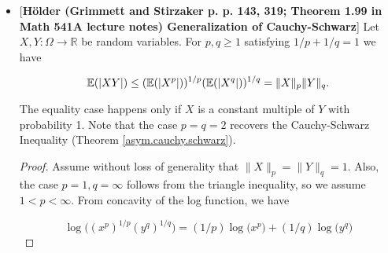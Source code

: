 \begin{itemize}
\begin{itemize}
\begin{proof}
But

\[
\E[a(X-\E X)+\phi(\E X)]  = a(\E X - \E X) + \E(\phi(\E X)) = \phi(\E X)
\]

which yields

\[
\phi( \E X) \leq \E \phi(X).
\]

\end{proof}

%
%
%
%
%
%
%
%
%
%
%

For some corollaries, see section \ref{cvx.sec.jensen.etc}.


\item \begin{theorem}\label{asym.thm.holder.ineq}[\textbf{H\"{o}lder (Grimmett and Stirzaker p. p. 143, 319; Theorem 1.99 in Math 541A lecture notes) Generalization of Cauchy-Schwarz}] Let \(X, Y : \Omega \to \mathbb{R}\) be random variables. For \(p, q \geq 1\) satisfying \(1/p + 1/q =1\) we have

\[
\mathbb{E}(|XY|) \leq (\mathbb{E}(|X^p|))^{1/p}(\mathbb{E}(|X^q|))^{1/q} = \lVert X \rVert_p \lVert Y \rVert_q.
\]

The equality case happens only if \(X\) is a constant multiple of \(Y\) with probability 1. Note that the case \(p=q=2\) recovers the Cauchy-Schwarz Inequality (Theorem \ref{asym.cauchy.schwarz}).
\end{theorem}

\begin{proof} Assume without loss of generality that \(\lVert X\rVert_p = \lVert Y \rVert_q = 1\). Also, the case \(p=1, q=\infty\) follows from the triangle inequality, so we assume \(1 < p < \infty\). From concavity of the log function, we have

\[
\log\big((x^p)^{1/p}(y^q)^{1/q} \big) = (1/p) \log \big( x^p\big) + (1/q) \log \big(y^q\big)
\]


\end{proof}
\end{itemize}
\end{itemize}
